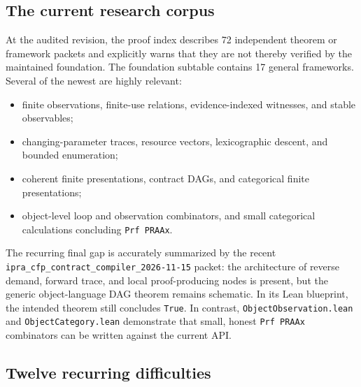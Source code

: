 \documentclass[11pt]{article}
\begin{document}
\subsection{The current research corpus}

At the audited revision, the proof index describes 72 independent theorem or
framework packets and explicitly warns that they are not thereby verified by
the maintained foundation.  The foundation subtable contains 17 general
frameworks.  Several of the newest are highly relevant:

\begin{itemize}
\item finite observations, finite-use relations, evidence-indexed witnesses,
      and stable observables;
\item changing-parameter traces, resource vectors, lexicographic descent, and
      bounded enumeration;
\item coherent finite presentations, contract DAGs, and categorical finite
      presentations;
\item object-level loop and observation combinators, and small categorical
      calculations concluding \texttt{Prf PRAAx}.
\end{itemize}

The recurring final gap is accurately summarized by the recent
\texttt{ipra\_cfp\_contract\_compiler\_2026-11-15} packet: the architecture of
reverse demand, forward trace, and local proof-producing nodes is present, but
the generic object-language DAG theorem remains schematic.  In its Lean
blueprint, the intended theorem still concludes \texttt{True}.  In contrast,
\texttt{ObjectObservation.lean} and \texttt{ObjectCategory.lean} demonstrate
that small, honest \texttt{Prf PRAAx} combinators can be written against the
current API.

\subsection{Twelve recurring difficulties}
\end{document}
